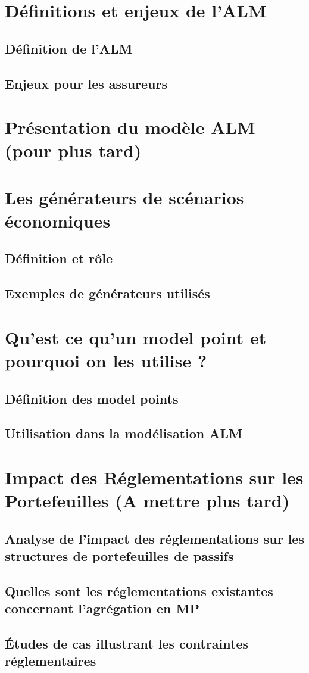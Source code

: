 \section{Définitions et enjeux de l’ALM}
\subsection{Définition de l’ALM}
\subsection{Enjeux pour les assureurs}

\section{Présentation du modèle ALM (pour plus tard)}

\section{Les générateurs de scénarios économiques}
\subsection{Définition et rôle}
\subsection{Exemples de générateurs utilisés}

\section{Qu’est ce qu’un model point et pourquoi on les utilise ?}
\subsection{Définition des model points}
\subsection{Utilisation dans la modélisation ALM}

\section{Impact des Réglementations sur les Portefeuilles (A mettre plus tard)}
\subsection{Analyse de l'impact des réglementations sur les structures de portefeuilles de passifs}
\subsection{Quelles sont les réglementations existantes concernant l’agrégation en MP}
\subsection{Études de cas illustrant les contraintes réglementaires}



